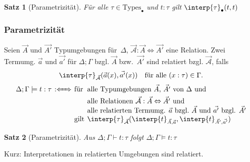 \documentclass{beamer}
\newcommand{\defiff}{:\xLeftrightarrow{\quad}} %
\newcommand{\Types}{\text{Types}}
\newcommand{\termInterp}[3]{\interp{#3}_{#1, #2}}
\newcommand{\relInterp}[2]{\interp{#2}_{#1}}
\newcommand{\Rel}[3]{#1 : #2 \Leftrightarrow #3}
\renewcommand{\emph}[1]{\textcolor{Emph}{#1}}
\newtheorem*{satz}{Satz}
\begin{document}
\begin{frame}
  \begin{satz}[Parametrizität]
    Für alle $\tau \in \Types_\bullet$ und $t : \tau$ gilt $\relInterp{\bullet}{\tau}(t, t)$
  \end{satz}
\end{frame}

\begin{frame}
  \frametitle{Parametrizität}

  Seien $\vec{A}$ und $\vec{A'}$ Typumgebungen für~$\Delta$, $\Rel{\vec{\mathcal{A}}}{\vec{A}}{\vec{A'}}$ eine Relation.
  Zwei Termumg. $\vec{a}$ und $\vec{a'}$ für $\Delta; \Gamma$ bzgl. $\vec{A}$ bzw.~$\vec{A'}$ sind \emph{relatiert} bzgl. $\vec{\mathcal{A}}$, falls
  \[
    \relInterp{\vec{\mathcal{A}}}{\tau}(\vec{a}(x), \vec{a'}(x))
    \quad \text{für alle $(x : \tau) \in \Gamma$}.
  \]
  \[
    \arraycolsep=2pt
    \begin{array}{r c l l}
    \Delta; \Gamma \models t : \tau &\defiff
    &\text{für}& \text{alle Typumgebungen $\vec{A}$, $\vec{A'}$ von~$\Delta$ und} \\
    &&& \text{alle Relationen $\Rel{\vec{\mathcal{A}}}{\vec{A}}{\vec{A'}}$ und} \\
    &&& \text{alle relatierten Termumg. $\vec{a}$ bzgl.~$\vec{A}$ und $\vec{a'}$ bzgl. $\vec{A'}$} \\
    &&\text{gilt}& \relInterp{\vec{\mathcal{A}}}{\tau}(\termInterp{\vec{A}}{\vec{a}}{t}, \termInterp{\vec{A'}}{\vec{a'}}{t})
  \end{array}
  \]

  \begin{satz}[Parametrizität]
    Aus $\Delta; \Gamma \vdash t : \tau$ folgt $\Delta; \Gamma \models t : \tau$
  \end{satz}

  Kurz: Interpretationen in relatierten Umgebungen sind relatiert.
\end{frame}
\end{document}
